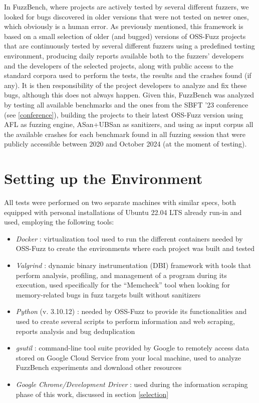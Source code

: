 In FuzzBench, where projects are actively tested by several different fuzzers, we looked for bugs discovered in older versions that were not tested on newer ones, which obviously is a human error. As previously mentioned, this framework is based on a small selection of older (and bugged) versions of OSS-Fuzz projects that are continuously tested by several different fuzzers using a predefined testing environment, producing daily reports available both to the fuzzers' developers and the developers of the selected projects, along with public access to the standard corpora used to perform the tests, the results and the crashes found (if any). It is then responsibility of the project developers to analyze and fix these bugs, although this does not always happen. Given this, FuzzBench was analyzed by testing all available benchmarks and the ones from the SBFT '23 conference (see \ref{conference}), building the projects to their latest OSS-Fuzz version using AFL as fuzzing engine, ASan+UBSan as sanitizers, and using as input corpus all the available crashes for each benchmark found in all fuzzing session that were publicly accessible between 2020 and October 2024 (at the moment of testing).


\section{Setting up the Environment}
All tests were performed on two separate machines with similar specs, both equipped with personal installations of Ubuntu 22.04 LTS already run-in and used, employing the following tools:
\begin{itemize}
    \item \textit{Docker} \cite{Docker}: virtualization tool used to run the different containers needed by OSS-Fuzz to create the environments where each project was built and tested
    \item \textit{Valgrind} \cite{Valgrind_1}\cite{Valgrind_2}: dynamic binary instrumentation (DBI) framework with tools that perform analysis, profiling, and management of a program during its execution, used specifically for the ``Memcheck'' tool when looking for memory-related bugs in fuzz targets built without sanitizers
    \item \textit{Python} (v. 3.10.12) \cite{python}: needed by OSS-Fuzz to provide its functionalities and used to create several scripts to perform information and web scraping, reports analysis and bug deduplication
    \item \textit{gsutil} \cite{gsutil}: command-line tool suite provided by Google to remotely access data stored on Google Cloud Service from your local machine, used to analyze FuzzBench experiments and download other resources
    \item \textit{Google Chrome/Development Driver} \cite{driver}: used during the information scraping phase of this work, discussed in section \ref{selection}
\end{itemize}

